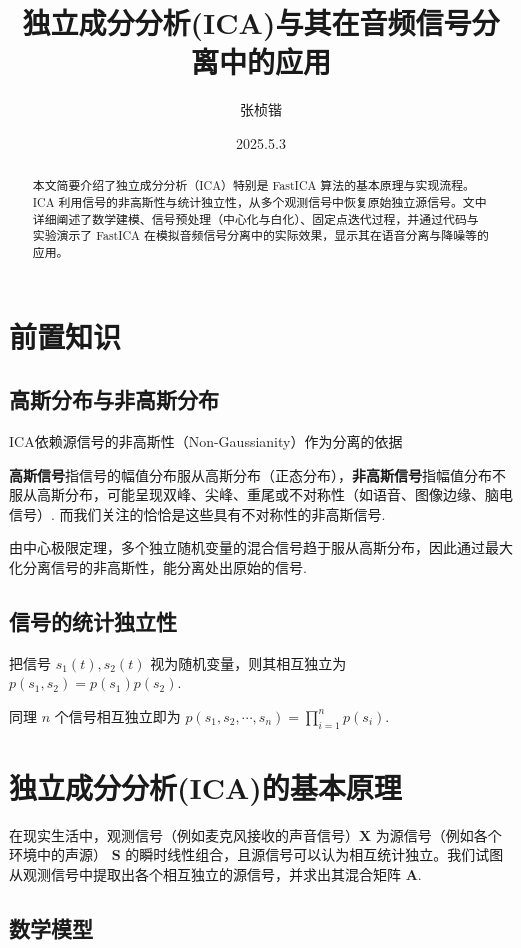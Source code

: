 \documentclass{article}
\title{独立成分分析(ICA)与其在音频信号分离中的应用}
\author{张桢锴}
\date{2025.5.3}
\newcommand{\bs}[1]{\boldsymbol{#1}}
\newcommand{\np}{\indent\par}
\begin{document}
\maketitle

\begin{abstract}
    本文简要介绍了独立成分分析（ICA）特别是 FastICA 算法的基本原理与实现流程。ICA 利用信号的非高斯性与统计独立性，从多个观测信号中恢复原始独立源信号。文中详细阐述了数学建模、信号预处理（中心化与白化）、固定点迭代过程，并通过代码与实验演示了 FastICA 在模拟音频信号分离中的实际效果，显示其在语音分离与降噪等的应用。 \np
\end{abstract}

\section{前置知识}

\subsection*{高斯分布与非高斯分布}

ICA依赖源信号的非高斯性（Non-Gaussianity）作为分离的依据 \np
\textbf{高斯信号}指信号的幅值分布服从高斯分布（正态分布），\textbf{非高斯信号}指幅值分布不服从高斯分布，可能呈现双峰、尖峰、重尾或不对称性（如语音、图像边缘、脑电信号）. 而我们关注的恰恰是这些具有不对称性的非高斯信号. \np
由中心极限定理，多个独立随机变量的混合信号趋于服从高斯分布，因此通过最大化分离信号的非高斯性，能分离处出原始的信号.

\subsection*{信号的统计独立性}
把信号 $s_1(t), s_2(t)$ 视为随机变量，则其相互独立为 $p(s_1, s_2) = p(s_1)p(s_2)$. \np
同理 $n$ 个信号相互独立即为 $p(s_1, s_2, \cdots, s_n) = \prod_{i = 1}^{n}p(s_i)$. \np

\section{独立成分分析(ICA)的基本原理}

在现实生活中，观测信号（例如麦克风接收的声音信号）$\bs{X}$ 为源信号（例如各个环境中的声源） $\bs{S}$ 的瞬时线性组合，且源信号可以认为相互统计独立。我们试图从观测信号中提取出各个相互独立的源信号，并求出其混合矩阵 $\bs{A}$. 

\subsection{数学模型}
\end{document}
